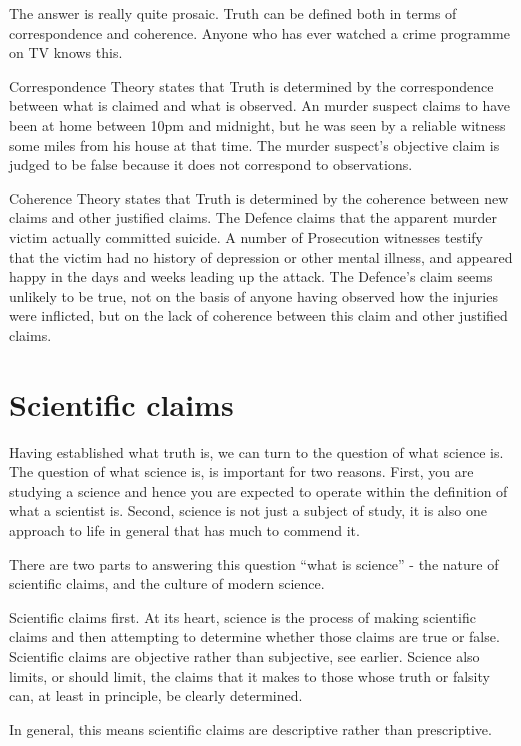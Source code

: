 \documentclass[12pt]{article}
\begin{document}
The answer is really quite prosaic. Truth can be defined both in terms
of correspondence and coherence. Anyone who has ever watched a crime
programme on TV knows this.

Correspondence Theory states that Truth is determined by the
correspondence between what is claimed and what is observed. An murder
suspect claims to have been at home between 10pm and midnight, but he
was seen by a reliable witness some miles from his house at that
time. The murder suspect's objective claim is judged to be false
because it does not correspond to observations.

Coherence Theory states that Truth is determined by the coherence
between new claims and other justified claims. The Defence claims that
the apparent murder victim actually committed suicide. A number of
Prosecution witnesses testify that the victim had no history of
depression or other mental illness, and appeared happy in the days and
weeks leading up the attack. The Defence's claim seems unlikely to be
true, not on the basis of anyone having observed how the injuries were
inflicted, but on the lack of coherence between this claim and other
justified claims.

\section{Scientific claims}

Having established what truth is, we can turn to the question of what
science is. The question of what science is, is important for two
reasons. First, you are studying a science and hence you are expected
to operate within the definition of what a scientist is. Second,
science is not just a subject of study, it is also one approach to
life in general that has much to commend it.

There are two parts to answering this question ``what is science'' -
the nature of scientific claims, and the culture of modern science.

Scientific claims first. At its heart, science is the process of
making scientific claims and then attempting to determine whether
those claims are true or false. Scientific claims are objective rather
than subjective, see earlier. Science also limits, or should limit,
the claims that it makes to those whose truth or falsity can, at least
in principle, be clearly determined.

In general, this means scientific claims are descriptive rather than
prescriptive.
\end{document}
